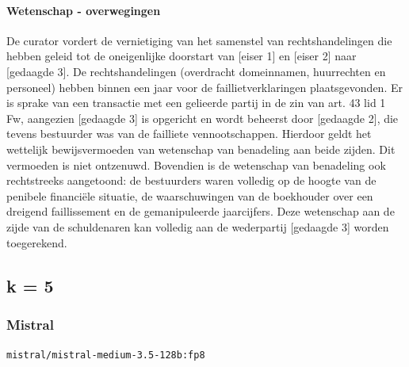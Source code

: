 \documentclass[
  dutch,
  a4paper,
]{article}
\begin{document}
\paragraph{Wetenschap - overwegingen}\label{wetenschap---overwegingen-20}

De curator vordert de vernietiging van het samenstel van rechtshandelingen die hebben geleid tot de oneigenlijke doorstart van {[}eiser 1{]} en {[}eiser 2{]} naar {[}gedaagde 3{]}. De rechtshandelingen (overdracht domeinnamen, huurrechten en personeel) hebben binnen een jaar voor de faillietverklaringen plaatsgevonden. Er is sprake van een transactie met een gelieerde partij in de zin van art. 43 lid 1 Fw, aangezien {[}gedaagde 3{]} is opgericht en wordt beheerst door {[}gedaagde 2{]}, die tevens bestuurder was van de failliete vennootschappen. Hierdoor geldt het wettelijk bewijsvermoeden van wetenschap van benadeling aan beide zijden. Dit vermoeden is niet ontzenuwd. Bovendien is de wetenschap van benadeling ook rechtstreeks aangetoond: de bestuurders waren volledig op de hoogte van de penibele financiële situatie, de waarschuwingen van de boekhouder over een dreigend faillissement en de gemanipuleerde jaarcijfers. Deze wetenschap aan de zijde van de schuldenaren kan volledig aan de wederpartij {[}gedaagde 3{]} worden toegerekend.

\newpage


\subsection{k = 5}\label{k-5-2}

\subsubsection{Mistral}\label{mistral-7}

\texttt{mistral/mistral-medium-3.5-128b:fp8}
\end{document}
